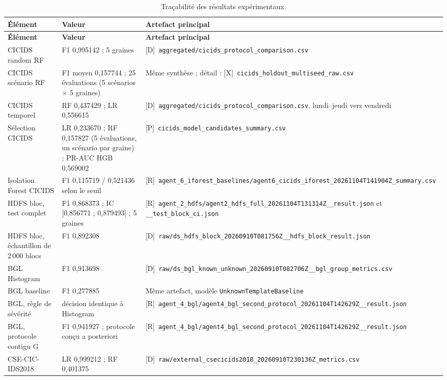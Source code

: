 \begin{longtable}{p{} p{} p{}}
\caption{Traçabilité des résultats expérimentaux.}\label{tab:preuves-experimentales}\\
\toprule
\textbf{Élément} & \textbf{Valeur} & \textbf{Artefact principal} \\
\midrule
\endfirsthead
\toprule
\textbf{Élément} & \textbf{Valeur} & \textbf{Artefact principal} \\
\midrule
\endhead
CICIDS random RF & F1 0,995142 ; 5 graines & [D]~\texttt{aggregated/cicids\_protocol\_comparison.csv} \\
CICIDS scénario RF & F1 moyen 0,157744 ; 25 évaluations (5 scénarios $\times$ 5 graines) & Même synthèse ; détail : [X]~\texttt{cicids\_holdout\_multiseed\_raw.csv} \\
CICIDS temporel & RF 0,437429 ; LR 0,556615 & [D]~\texttt{aggregated/cicids\_protocol\_comparison.csv}, lundi--jeudi vers vendredi \\
Sélection CICIDS & LR 0,233670 ; RF 0,157827 (5 évaluations, un scénario par graine) ; PR-AUC HGB 0,569002 & [P]~\texttt{cicids\_model\_candidates\_summary.csv} \\
Isolation Forest CICIDS & F1 0,115719 / 0,521436 selon le seuil & [R]~\texttt{agent\_6\_iforest\_baselines/agent6\_cicids\_iforest\_20261104T141904Z\_summary.csv} \\
HDFS bloc, test complet & F1 0,868373 ; IC [0,856771 ; 0,879493] ; 5 graines & [R]~\texttt{agent\_2\_hdfs/agent2\_hdfs\_full\_20261104T131314Z\_\_result.json} et \texttt{\_\_test\_block\_ci.json} \\
HDFS bloc, échantillon de $2\,000$ blocs & F1 0,892308 & [D]~\texttt{raw/ds\_hdfs\_block\_20260910T081756Z\_\_hdfs\_block\_result.json} \\
BGL Histogram & F1 0,913698 & [D]~\texttt{raw/ds\_bgl\_known\_unknown\_20260910T082706Z\_\_bgl\_group\_metrics.csv} \\
BGL baseline & F1 0,277885 & Même artefact, modèle \texttt{UnknownTemplateBaseline} \\
BGL, règle de sévérité & décision identique à Histogram & [R]~\texttt{agent\_4\_bgl/agent4\_bgl\_second\_protocol\_20261104T142629Z\_\_result.json} \\
BGL, protocole contigu G & F1 0,941927 ; protocole conçu a posteriori & [R]~\texttt{agent\_4\_bgl/agent4\_bgl\_second\_protocol\_20261104T142629Z\_\_result.json} \\
CSE-CIC-IDS2018 & LR 0,999212 ; RF 0,401375 & [D]~\texttt{raw/external\_csecicids2018\_20260910T230136Z\_metrics.csv} \\

\end{longtable}
